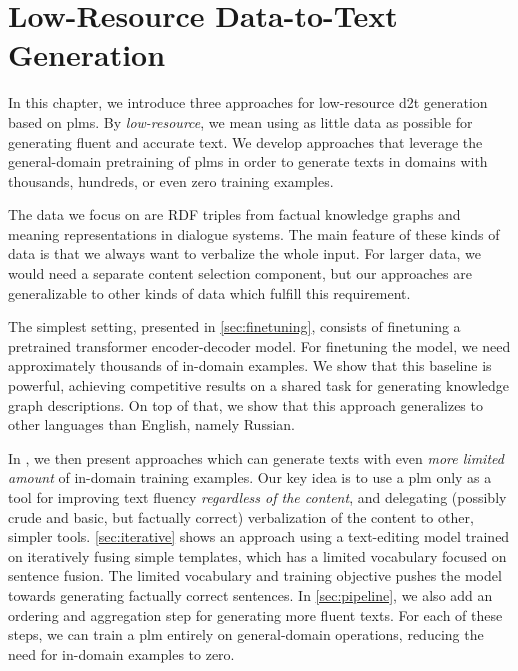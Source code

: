 \chapter{Low-Resource Data-to-Text Generation}
\label{chap:low-res}


In this chapter, we introduce three approaches for low-resource \ac{d2t} generation based on \acp{plm}. By \emph{low-resource}, we mean using as little data as possible for generating fluent and accurate text. We develop approaches that leverage the general-domain pretraining of \acp{plm} in order to generate texts in domains with thousands, hundreds, or even zero training examples.

The data we focus on are RDF triples from factual knowledge graphs and meaning representations in dialogue systems. The main feature of these kinds of data is that we always want to verbalize the whole input. For larger data, we would need a separate content selection component, but our approaches are generalizable to other kinds of data which fulfill this requirement.

The simplest setting, presented in \autoref{sec:finetuning}, consists of finetuning a pretrained transformer encoder-decoder model. For finetuning the model, we need approximately thousands of in-domain examples. We show that this baseline is powerful, achieving competitive results on a shared task for generating knowledge graph descriptions. On top of that, we show that this approach generalizes to other languages than English, namely Russian.

In , we then present approaches which can generate texts with even \emph{more limited amount} of in-domain training examples. Our key idea is to use a \ac{plm} only as a tool for improving text fluency \emph{regardless of the content}, and delegating (possibly crude and basic, but factually correct) verbalization of the content to other, simpler tools. \autoref{sec:iterative} shows an approach using a text-editing model trained on iteratively fusing simple templates, which has a limited vocabulary focused on sentence fusion. The limited vocabulary and training objective pushes the model towards generating factually correct sentences. In \autoref{sec:pipeline}, we also add an ordering and aggregation step for generating more fluent texts. For each of these steps, we can train a \ac{plm} entirely on general-domain operations, reducing the need for in-domain examples to zero.

